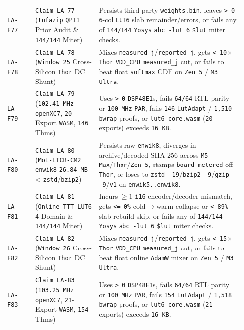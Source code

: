 \documentclass[10pt]{article}
\begin{document}
{\begin{longtable}{@{}L{0.11\linewidth}L{0.25\linewidth}L{0.58\linewidth}@{}}
\texttt{LA-F77} & \texttt{Claim LA-77} (\texttt{tufazip} \texttt{QPI1} Prior Audit \& \texttt{144/144} Miter) & Persists third-party \texttt{weights.bin}, leaves \texttt{> 0} \texttt{6}-col \texttt{LUT6} slab remainder/errors, or fails any of \texttt{144/144} \texttt{Yosys} \texttt{abc -lut 6} \texttt{\$lut} miter checks. \\
\texttt{LA-F78} & \texttt{Claim LA-78} (\texttt{Window 25} Cross-Silicon \texttt{Thor} DC Shunt) & Mixes \texttt{measured\_j}/\texttt{reported\_j}, gets \texttt{< 10$\times$} \texttt{Thor} \texttt{VDD\_CPU} \texttt{measured\_j} cut, or fails to beat float \texttt{softmax} CDF on \texttt{Zen 5} / \texttt{M3 Ultra}. \\
\texttt{LA-F79} & \texttt{Claim LA-79} (\texttt{102.41 MHz openXC7}, \texttt{20}-Export \texttt{WASM}, \texttt{146} Thms) & Uses \texttt{> 0} \texttt{DSP48E1}s, fails \texttt{64/64} RTL parity or \texttt{100 MHz} \texttt{PAR}, fails \texttt{146} \texttt{LutAdapt} / \texttt{1,510} \texttt{bwrap} proofs, or \texttt{lut6\_core.wasm} (\texttt{20} exports) exceeds \texttt{16 KB}. \\
\texttt{LA-F80} & \texttt{Claim LA-80} (\texttt{MoL-LTCB-CM2} \texttt{enwik8} \texttt{26.84 MB} < \texttt{zstd}/\texttt{bzip2}) & Persists raw \texttt{enwik8}, diverges in archive/decoded SHA-256 across \texttt{M5 Max}/\texttt{Thor}/\texttt{Zen 5}, stamps \texttt{board\_metered} off-\texttt{Thor}, or loses to \texttt{zstd -19}/\texttt{bzip2 -9}/\texttt{gzip -9}/\texttt{v1} on \texttt{enwik5..enwik8}. \\
\texttt{LA-F81} & \texttt{Claim LA-81} (\texttt{Online-TTT-LUT6} \texttt{4}-Domain \& \texttt{144/144} Miter) & Incurs $\ge 1$ \texttt{i16} encoder/decoder mismatch, gets \texttt{<= 0\%} cold$\to$warm collapse or \texttt{< 89\%} slab-rebuild skip, or fails any of \texttt{144/144} \texttt{Yosys} \texttt{abc -lut 6} \texttt{\$lut} miter checks. \\
\texttt{LA-F82} & \texttt{Claim LA-82} (\texttt{Window 26} Cross-Silicon \texttt{Thor} DC Shunt) & Mixes \texttt{measured\_j}/\texttt{reported\_j}, gets \texttt{< 15$\times$} \texttt{Thor} \texttt{VDD\_CPU} \texttt{measured\_j} cut, or fails to beat float online \texttt{AdamW} mixer on \texttt{Zen 5} / \texttt{M3 Ultra}. \\
\texttt{LA-F83} & \texttt{Claim LA-83} (\texttt{103.25 MHz openXC7}, \texttt{21}-Export \texttt{WASM}, \texttt{154} Thms) & Uses \texttt{> 0} \texttt{DSP48E1}s, fails \texttt{64/64} RTL parity or \texttt{100 MHz} \texttt{PAR}, fails \texttt{154} \texttt{LutAdapt} / \texttt{1,518} \texttt{bwrap} proofs, or \texttt{lut6\_core.wasm} (\texttt{21} exports) exceeds \texttt{16 KB}. \\

\end{longtable}}
\end{document}
